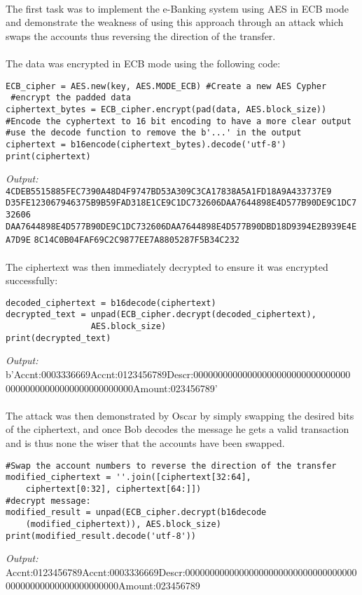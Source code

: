 \paragraph{ }The first task was to implement the e-Banking system using AES in ECB mode and demonstrate the weakness of using this approach through an attack which swaps the accounts thus reversing the direction of the transfer.

\paragraph{ }The data was encrypted in ECB mode using the following code:

\begin{lstlisting}
ECB_cipher = AES.new(key, AES.MODE_ECB) #Create a new AES Cypher
 #encrypt the padded data
ciphertext_bytes = ECB_cipher.encrypt(pad(data, AES.block_size))
#Encode the cyphertext to 16 bit encoding to have a more clear output
#use the decode function to remove the b'...' in the output
ciphertext = b16encode(ciphertext_bytes).decode('utf-8')
print(ciphertext)
\end{lstlisting}
\textit{Output:} \texttt{4CDEB5515885FEC7390A48D4F9747BD53A309C3CA17838A5A1FD18A9A433737E9}\\
\texttt{D35FE123067946375B9B59FAD318E1CE9C1DC732606DAA7644898E4D577B90DE9C1DC732606}
\texttt{DAA7644898E4D577B90DE9C1DC732606DAA7644898E4D577B90DBD18D9394E2B939E4EA7D9E}
\texttt{8C14C0B04FAF69C2C9877EE7A8805287F5B34C232}

\paragraph{ }The ciphertext was then immediately decrypted to ensure it was encrypted successfully:
\begin{lstlisting}
decoded_ciphertext = b16decode(ciphertext) 
decrypted_text = unpad(ECB_cipher.decrypt(decoded_ciphertext),
				 AES.block_size)
print(decrypted_text)
\end{lstlisting}
\textit{Output:} b'Accnt:0003336669Accnt:0123456789Descr:00000000000000000000000000000000\\
00000000000000000000000000Amount:023456789'

\paragraph{ }The attack was then demonstrated by Oscar by simply swapping the desired bits of the ciphertext, and once Bob decodes the message he gets a valid transaction and is thus none the wiser that the accounts have been swapped.
\begin{lstlisting}
#Swap the account numbers to reverse the direction of the transfer
modified_ciphertext = ''.join([ciphertext[32:64],
	ciphertext[0:32], ciphertext[64:]])
#decrypt message:
modified_result = unpad(ECB_cipher.decrypt(b16decode
	(modified_ciphertext)), AES.block_size)
print(modified_result.decode('utf-8'))
\end{lstlisting}  
\textit{Output:} Accnt:0123456789Accnt:0003336669Descr:00000000000000000000000000000000000\\
00000000000000000000000Amount:023456789

